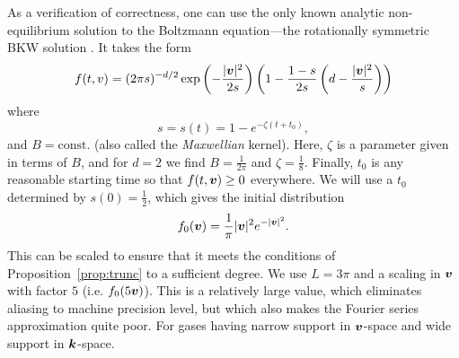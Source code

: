 As a verification of correctness, one can use the only known analytic
non-equilibrium solution to the Boltzmann equation—the rotationally symmetric BKW
solution \cite{Bobylev75,Krook77,Tourenne83,Ernst84}. It takes the form
\begin{equation} \label{eqn:bkw}
    f(t,v) = (2\pi s)^{-d/2} \exp\left(-\frac{|{\bm v}|^2}{2s}\right)
            \left(1-\frac{1-s}{2s} \left(d-\frac{|{\bm v}|^2}{s}\right)\right)
\end{equation}
where 
\[
    s = s(t) = 1 - e^{-\zeta(t+t_0)},
\]
and $B=\text{const.}$ (also called the {\em Maxwellian} kernel). Here,
$\zeta$ is a parameter given in terms of $B$, and for $d=2$ we find
$B=\frac{1}{2\pi}$ and $\zeta = \frac{1}{8}$. Finally, $t_0$ is any
reasonable starting time so that $f(t,{\bm v})\geq0$ everywhere. We will use a
$t_0$ determined by $s(0) = \frac{1}{2}$, which gives the initial distribution
\[
    f_0({\bm v}) = \frac{1}{\pi}|{\bm v}|^2e^{-|{\bm v}|^2}.
\]
This can be scaled to ensure that it meets the conditions of Proposition~\ref{prop:trunc} to a sufficient
degree. We use $L=3\pi$ and a scaling in ${\bm v}$ with factor $5$ (i.e. $f_0(5{\bm v})$). This is a relatively
large value, which eliminates aliasing to machine precision level, but which also makes the Fourier series
approximation quite poor. For gases having narrow support in ${\bm v}$-space and wide support in ${\bm k}$-space.


